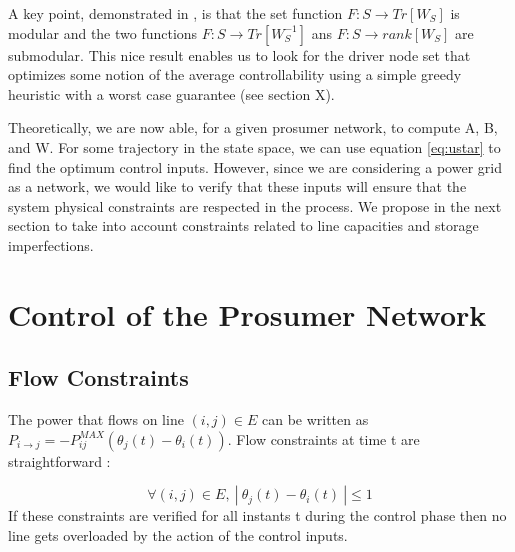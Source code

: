 \documentclass[conference]{IEEEtran}
\begin{document}
A key point, demonstrated in \cite{Summers2014}, is that the set function $ F:S \longrightarrow Tr[W_S] $ is modular and the two functions $F:S \longrightarrow Tr[W^{-1}_S] $ ans $ F:S \longrightarrow rank[W_S] $ are submodular. This nice result enables us to look for the driver node set that optimizes some notion of the average controllability using a simple greedy heuristic with a worst case guarantee (see section X).

Theoretically, we are now able, for a given prosumer network, to compute A, B, and W. For some trajectory in the state space, we can use equation \ref{eq:ustar} to find the optimum control inputs. However, since we are considering a power grid as a network, we would like to verify that these inputs will ensure that the system physical constraints are respected in the process. We propose in the next section to take into account constraints related to line capacities and storage imperfections.

\section{Control of the Prosumer Network}
\label{sec:Control_prosumer}



\subsection{Flow Constraints}

The power that flows on line $ (i,j) \in E$ can be written as $ P_{i \longrightarrow j} = -P_{ij}^{MAX} \left( \theta_j(t) - \theta_i(t) \right) $. Flow constraints at time t are straightforward :

\begin{equation}
\label{eq:flow_cons}
\forall (i,j) \in E,\ \left|\ \theta_j(t) - \theta_i(t)\ \right| \leq 1
\end{equation}
If these constraints are verified for all instants t during the control phase then no line gets overloaded by the action of the control inputs. 
\end{document}

